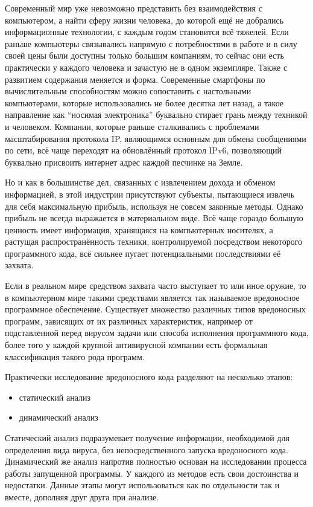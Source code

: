 
Современный мир уже невозможно представить без взаимодействия с компьютером, а найти сферу жизни человека, до которой ещё не добрались информационные технологии, с каждым годом становится всё тяжелей.
Если раньше компьютеры связывались напрямую с потребностями в работе и в силу своей цены были доступны только большим компаниям, то сейчас они есть практически у каждого человека и зачастую не в одном экземпляре.
Также с развитием содержания меняется и форма.
Современные смартфоны по вычислительным способностям можно сопоставить с настольными компьютерами, которые использовались не более десятка лет назад, а такое направление как “носимая электроника” буквально стирает грань между техникой и человеком.
Компании, которые раньше сталкивались с проблемами масштабирования протокола IP, являющимся основным для обмена сообщениями по сети, всё чаще переходят на обновлённый протокол IPv6, позволяющий буквально присвоить интернет адрес каждой песчинке на Земле.

Но и как в большинстве дел, связанных с извлечением дохода и обменом информацией, в этой индустрии присутствуют субъекты, пытающиеся извлечь для себя максимальную прибыль, используя не совсем законные методы.
Однако прибыль не всегда выражается в материальном виде.
Всё чаще гораздо большую ценность имеет информация, хранящаяся на компьютерных носителях, а растущая распространённость техники, контролируемой посредством некоторого программного кода, всё сильнее пугает потенциальными последствиями её захвата.

Если в реальном мире средством захвата часто выступает то или иное оружие, то в компьютерном мире такими средствами является так называемое вредоносное программное обеспечение.
Существует множество различных типов вредоносных программ, зависящих от их различных характеристик, например от подставленной перед вирусом задачи или способа исполнения программного кода, более того у каждой крупной антивирусной компании есть формальная классификация такого рода программ.

Практически исследование вредоносного кода разделяют на несколько этапов:
\begin{itemize}
\item статический анализ
\item динамический анализ
\end{itemize}
Статический анализ подразумевает получение информации, необходимой для определения вида вируса, без непосредственного запуска вредоносного кода.
Динамический же анализ напротив полностью основан на исследовании процесса работы запущенной программы.
У каждого из методов есть свои достоинства и недостатки.
Данные этапы могут использоваться как по отдельности так и вместе, дополняя друг друга при анализе.


